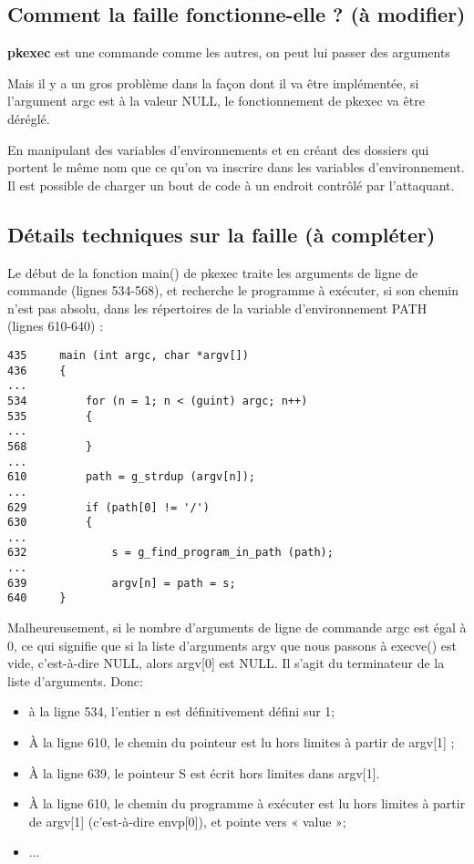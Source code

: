 \documentclass[a4paper, 12pt]{article}
\begin{document}
   		\subsection{Comment la faille fonctionne-elle ? (à modifier) }
   		\begin{flushleft}
   			\noindent \textbf{pkexec} est une commande comme les autres, on peut lui passer des arguments
   			\item Mais il y a un gros problème dans la façon dont il va être implémentée, si l'argument argc est à la valeur NULL, le fonctionnement de pkexec va être déréglé. 
   			\item En manipulant des variables d'environnements et en créant des dossiers qui portent le même nom que ce qu'on va inscrire dans les variables d'environnement. Il est possible de charger un bout de code à un endroit contrôlé par l'attaquant. 
   		\end{flushleft}
   		
   		\subsection{Détails techniques sur la faille (à compléter) }
   		\begin{flushleft}
   			\noindent Le début de la fonction main() de pkexec traite les arguments de ligne de commande (lignes 534-568), et recherche le programme à exécuter, si son chemin n’est pas absolu, dans les répertoires de la variable d'environnement PATH (lignes 610-640) :
   			\begin{lstlisting}
435 	main (int argc, char *argv[])
436 	{
...
534 		for (n = 1; n < (guint) argc; n++)
535     	{
...
568     	}
...
610   		path = g_strdup (argv[n]);
...
629   		if (path[0] != '/')
630     	{
...
632     		s = g_find_program_in_path (path);
...
639       		argv[n] = path = s;
640     }
        	\end{lstlisting}
        	\item Malheureusement, si le nombre d’arguments de ligne de commande argc est égal à 0, ce qui signifie que si la liste d’arguments argv que nous passons à execve() est vide, c’est-à-dire {NULL}, alors argv[0] est NULL. Il s’agit du terminateur de la liste d’arguments. Donc:
        	\begin{itemize}
        		\item à la ligne 534, l’entier n est définitivement défini sur 1;
        		\item À la ligne 610, le chemin du pointeur est lu hors limites à partir de argv[1] ;
        		\item À la ligne 639, le pointeur S est écrit hors limites dans argv[1].
        		\item À la ligne 610, le chemin du programme à exécuter est lu hors limites à partir de argv[1] (c’est-à-dire envp[0]), et pointe vers « value »;
        		\item ...
        	\end{itemize}
        	
   		\end{flushleft}
\end{document}
